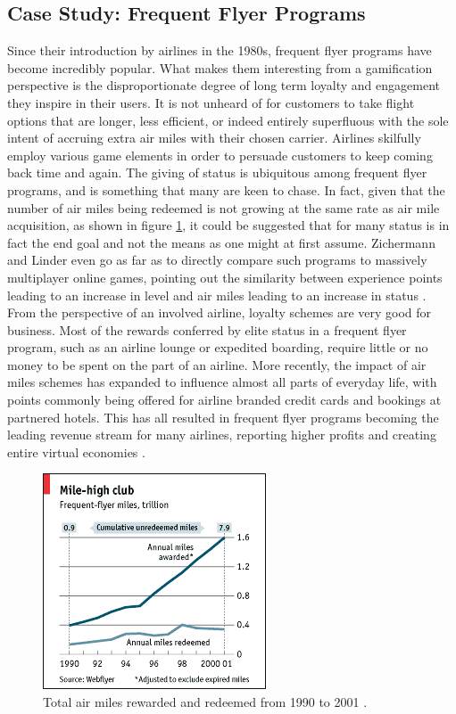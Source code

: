 \documentclass[12pt,a4paper,twoside]{report}
\begin{document}
\subsection{Case Study: Frequent Flyer Programs}
Since their introduction by airlines in the 1980s, frequent flyer programs have become incredibly popular. What makes them interesting from a gamification perspective is the disproportionate degree of long term loyalty and engagement they inspire in their users. It is not unheard of for customers to take flight options that are longer, less efficient, or indeed entirely superfluous with the sole intent of accruing extra air miles with their chosen carrier. Airlines skilfully employ various game elements in order to persuade customers to keep coming back time and again. The giving of status is ubiquitous among frequent flyer programs, and is something that many are keen to chase. In fact, given that the number of air miles being redeemed is not growing at the same rate as air mile acquisition, as shown in figure \ref{freq-flyer}, it could be suggested that for many status is in fact the end goal and not the means as one might at first assume. Zichermann and Linder even go as far as to directly compare such programs to massively multiplayer online games, pointing out the similarity between experience points leading to an increase in level and air miles leading to an increase in status \cite{zichermann2010game}. From the perspective of an involved airline, loyalty schemes are very good for business. Most of the rewards conferred by elite status in a frequent flyer program, such as an airline lounge or expedited boarding, require little or no money to be spent on the part of an airline. More recently, the impact of air miles schemes has expanded to influence almost all parts of everyday life, with points commonly being offered for airline branded credit cards and bookings at partnered hotels. This has all resulted in frequent flyer programs becoming the leading revenue stream for many airlines, reporting higher profits and creating entire virtual economies \cite{zichermann2010game}.

\begin{figure}
\begin{center}
	\includegraphics{../img/flyer.png}
	\caption{Total air miles rewarded and redeemed from 1990 to 2001 \cite{freq-fly}.}
	\label{freq-flyer}
\end{center}
\end{figure}
\end{document}
